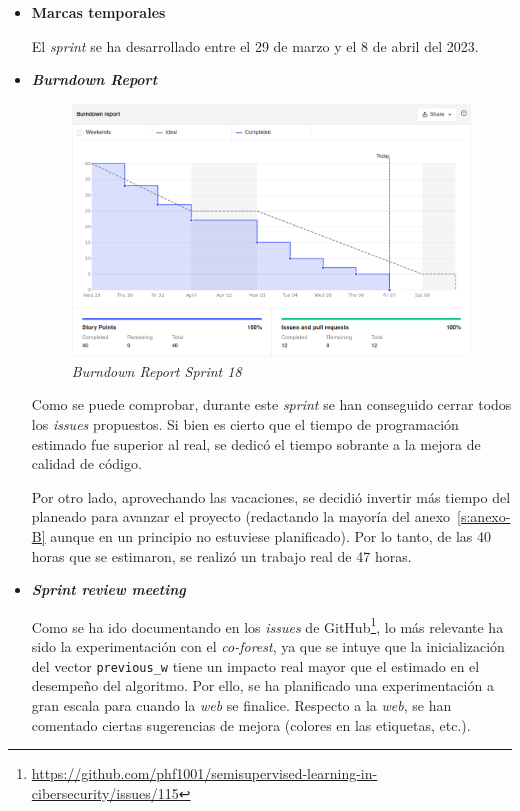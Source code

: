 \begin{itemize}
\begin{enumerate}
	\end{enumerate}
	\item \textbf{Marcas temporales}		
	
	El \textit{sprint} se ha desarrollado entre el 29 de marzo y el 8 de abril del 2023.
	
	\item \textbf{\textit{Burndown Report}}
	
		\begin{figure}[h]
		\caption[\textit{Sprint} 18: \textit{burndown report}]{\textit{Burndown Report Sprint 18}}
		\centering
		\includegraphics[width=\textwidth]{../img/anexos/bdr/s18_bdr}
	\end{figure}

	Como se puede comprobar, durante este \textit{sprint} se han conseguido cerrar todos los \textit{issues} propuestos. Si bien es cierto que el tiempo de programación estimado fue superior al real, se dedicó el tiempo sobrante a la mejora de calidad de código.
	
	Por otro lado, aprovechando las vacaciones, se decidió invertir más tiempo del planeado para avanzar el proyecto (redactando la mayoría del anexo~\ref{s:anexo-B} aunque en un principio no estuviese planificado). Por lo tanto, de las 40 horas que se estimaron, se realizó un trabajo real de 47 horas.


	\item \textbf{\textit{Sprint review meeting}}
	
	Como se ha ido documentando en los \textit{issues} de GitHub\footnote{\url{https://github.com/phf1001/semisupervised-learning-in-cibersecurity/issues/115}}, lo más relevante ha sido la experimentación con el \textit{co-forest}, ya que se intuye que la inicialización del vector \texttt{previous\_w} tiene un impacto real mayor que el estimado en el desempeño del algoritmo. Por ello, se ha planificado una experimentación a gran escala para cuando la \textit{web} se finalice. Respecto a la \textit{web}, se han comentado ciertas sugerencias de mejora (colores en las etiquetas, etc.).
	
\end{itemize}


